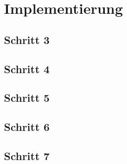 
\section{Implementierung} 





\clearpage
\subsection{Schritt 3}



\clearpage
\subsection{Schritt 4}


\clearpage 
\subsection{Schritt 5}


\clearpage
\subsection{Schritt 6}


\clearpage
\subsection{Schritt 7}
